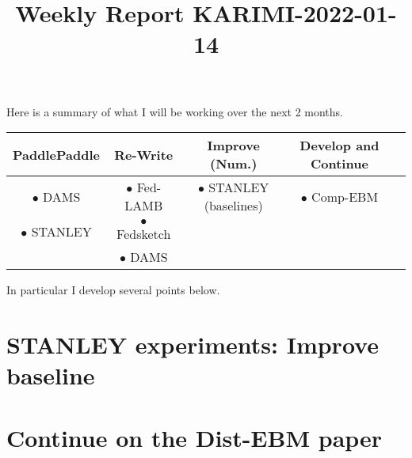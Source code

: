 \documentclass{article}
\begin{document}
\title{Weekly Report KARIMI-2022-01-14}


\date{}
\maketitle




Here is a summary of what I will be working over the next 2 months.

\begin{center}
\begin{tabular}{ |c|c|c|c|c| } 
\hline
PaddlePaddle & Re-Write & Improve (Num.)& Develop and Continue \\
\hline
$\bullet$ DAMS & $\bullet$ Fed-LAMB & $\bullet$ STANLEY (baselines) & $\bullet$ Comp-EBM\\ 
$\bullet$  STANLEY & $\bullet$ Fedsketch &  & \\ 
  & $\bullet$ DAMS &  & \\ 
\hline
\end{tabular}
\end{center}


In particular I develop several points below.

\section{STANLEY experiments: Improve baseline}

\section{Continue on the Dist-EBM paper}





\end{document}
